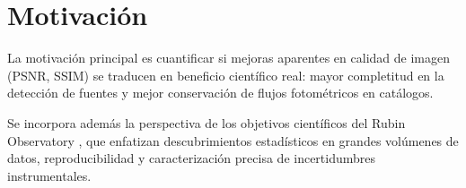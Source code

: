 \chapter{Motivación}
La motivación principal es cuantificar si mejoras aparentes en calidad de imagen (PSNR, SSIM) se traducen en beneficio científico real: mayor completitud en la detección de fuentes y mejor conservación de flujos fotométricos en catálogos.

\bigskip

Se incorpora además la perspectiva de los objetivos científicos del Rubin Observatory \cite{objetivos_rubin_2024}, que enfatizan descubrimientos estadísticos en grandes volúmenes de datos, reproducibilidad y caracterización precisa de incertidumbres instrumentales.
